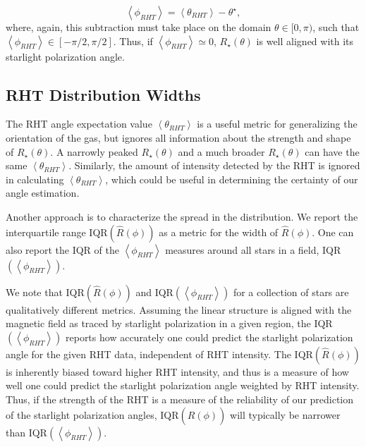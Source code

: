 \documentclass[12pt]{emulateapj}
\newcommand{\beq}{\begin{equation}}
\newcommand{\eeq}{\end{equation}}
\begin{document}
\beq
\label{phi_RHT}
\left<\phi_{RHT}\right> =  \left<\theta_{RHT} \right> - \theta^\star,
\eeq
where, again, this subtraction must take place on the domain $\theta \in [0, \pi)$, such that $\left<\phi_{RHT}\right> \in [-\pi/2, \pi/2]$. Thus, if $\left<\phi_{RHT}\right> \simeq 0$, ${R_\star(\theta)}$ is well aligned with its starlight polarization angle.  \\

\subsection{RHT Distribution Widths}\label{distwidth}
The RHT angle expectation value ${\left<\theta_{RHT} \right>}$ is a useful metric for generalizing the orientation of the gas, but ignores all information about the strength and shape of $R_\star\left(\theta\right)$. A narrowly peaked $R_\star\left(\theta\right)$ and a much broader $R_\star\left(\theta\right)$ can have the same $\left<\theta_{RHT} \right>$. Similarly, the amount of intensity detected by the RHT is ignored in calculating $\left<\theta_{RHT} \right>$, which could be useful in determining the certainty of our angle estimation.

Another approach is to characterize the spread in the distribution. We report the interquartile range IQR$({\hat{R}(\phi)})$ as a metric for the width of ${\hat{R}(\phi)}$. One can also report the IQR of the $\left<\phi_{RHT}\right>$ measures around all stars in a field, IQR${\left(\left<\phi_{RHT}\right>\right)}$.

We note that IQR$({\hat{R}(\phi)})$ and IQR${\left(\left<\phi_{RHT}\right>\right)}$ for a collection of stars are qualitatively different metrics. Assuming the linear structure is aligned with the magnetic field as traced by starlight polarization in a given region, the IQR${\left(\left<\phi_{RHT} \right>\right)}$ reports how accurately one could predict the starlight polarization angle for the given RHT data, independent of RHT intensity. The IQR$({\hat{R}(\phi)})$ is inherently biased toward higher RHT intensity, and thus is a measure of how well one could predict the starlight polarization angle weighted by RHT intensity. Thus, if the strength of the RHT is a measure of the reliability of our prediction of the starlight polarization angles, IQR$({\hat{R}(\phi)})$ will typically be narrower than IQR${\left(\left<\phi_{RHT}\right>\right)}$.
\end{document}
